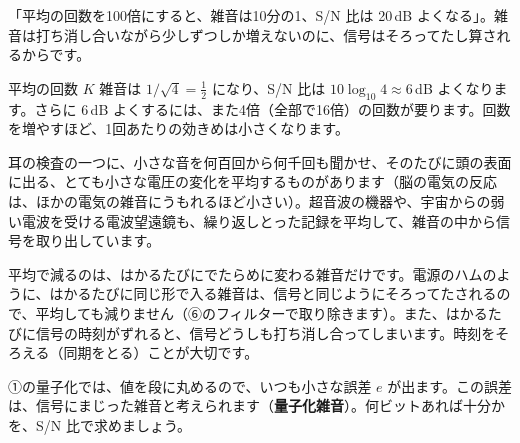 \begin{phyomi}[$\sigma_K=\sigma/\sqrt K$]
「平均の回数を100倍にすると、雑音は10分の1、S/N 比は 20\,dB よくなる」。雑音は打ち消し合いながら少しずつしか増えないのに、信号はそろってたし算されるからです。
\end{phyomi}

\begin{phbaisuru}[4倍]{平均の回数 $K$}
雑音は $1/\sqrt4=\tfrac12$ になり、S/N 比は $10\log_{10}4\approx6$\,dB よくなります。さらに 6\,dB よくするには、また4倍（全部で16倍）の回数が要ります。回数を増やすほど、1回あたりの効きめは小さくなります。
\end{phbaisuru}

\begin{phmijika}[病院の検査と、平均]
耳の検査の一つに、小さな音を何百回から何千回も聞かせ、そのたびに頭の表面に出る、とても小さな電圧の変化を平均するものがあります（脳の電気の反応は、ほかの電気の雑音にうもれるほど小さい）。超音波の機器や、宇宙からの弱い電波を受ける電波望遠鏡も、繰り返しとった記録を平均して、雑音の中から信号を取り出しています。
\end{phmijika}

\begin{seikaku}
平均で減るのは、はかるたびにでたらめに変わる雑音だけです。電源のハムのように、はかるたびに同じ形で入る雑音は、信号と同じようにそろってたされるので、平均しても減りません（⑥のフィルターで取り除きます）。また、はかるたびに信号の時刻がずれると、信号どうしも打ち消し合ってしまいます。時刻をそろえる（同期をとる）ことが大切です。
\end{seikaku}

\label{ph:波-11:sec8}
①の量子化では、値を段に丸めるので、いつも小さな誤差 $e$ が出ます。この誤差は、信号にまじった雑音と考えられます（\textbf{量子化雑音}）。何ビットあれば十分かを、S/N 比で求めましょう。

